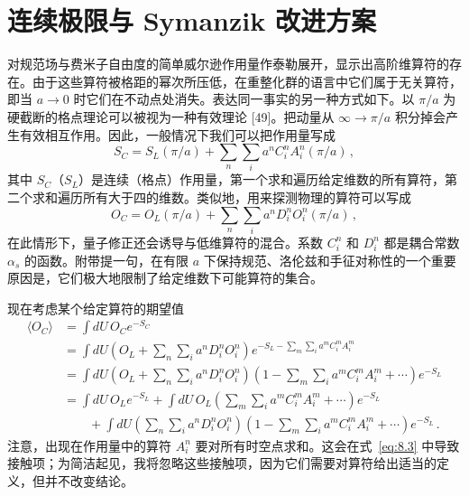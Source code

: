 \chapter{连续极限与 Symanzik 改进方案}

对规范场与费米子自由度的简单威尔逊作用量作泰勒展开，显示出高阶维算符的存在。由于这些算符被格距的幂次所压低，在重整化群的语言中它们属于无关算符，即当 $a \to 0$ 时它们在不动点处消失。表达同一事实的另一种方式如下。以 $\pi/a$ 为硬截断的格点理论可以被视为一种有效理论 [49]。把动量从 $\infty \to \pi/a$ 积分掉会产生有效相互作用。因此，一般情况下我们可以把作用量写成
\begin{equation}
S_C = S_L(\pi/a) + \sum_n \sum_i a^n C_i^n A_i^n(\pi/a) \,,
\label{eq:8.1}
\end{equation}
其中 $S_C$（$S_L$）是连续（格点）作用量，第一个求和遍历给定维数的所有算符，第二个求和遍历所有大于四的维数。类似地，用来探测物理的算符可以写成
\begin{equation}
O_C = O_L(\pi/a) + \sum_n \sum_i a^n D_i^n O_i^n(\pi/a) \,,
\label{eq:8.2}
\end{equation}
在此情形下，量子修正还会诱导与低维算符的混合。系数 $C_i^n$ 和 $D_i^n$ 都是耦合常数 $\alpha_s$ 的函数。附带提一句，在有限 $a$ 下保持规范、洛伦兹和手征对称性的一个重要原因是，它们极大地限制了给定维数下可能算符的集合。

现在考虑某个给定算符的期望值
\begin{equation}
\begin{split}
\langle O_C \rangle &= \int dU\, O_C e^{-S_C} \\
&= \int dU \left( O_L + \sum_n \sum_i a^n D_i^n O_i^n \right)
   e^{-S_L - \sum_m \sum_i a^m C_i^m A_i^m} \\
&= \int dU \left( O_L + \sum_n \sum_i a^n D_i^n O_i^n \right)
   \left( 1 - \sum_m \sum_i a^m C_i^m A_i^m + \cdots \right) e^{-S_L} \\
&= \int dU\, O_L e^{-S_L}
   + \int dU\, O_L \left( \sum_m \sum_i a^m C_i^m A_i^m + \cdots \right) e^{-S_L} \\
&\qquad + \int dU \left( \sum_n \sum_i a^n D_i^n O_i^n \right)
   \left( 1 - \sum_m \sum_i a^m C_i^m A_i^m + \cdots \right) e^{-S_L} \,.
\end{split}
\label{eq:8.3}
\end{equation}
注意，出现在作用量中的算符 $A_i^n$ 要对所有时空点求和。这会在式~\ref{eq:8.3} 中导致接触项；为简洁起见，我将忽略这些接触项，因为它们需要对算符给出适当的定义，但并不改变结论。

